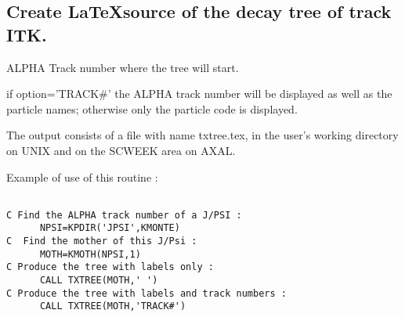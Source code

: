 \subsection{\label{sec-TXTR}Create \LaTeX   source of the decay tree of track ITK.}
\par
{}
\par
\begin{indentlist}{ 2.50cm}{ 2.75cm}
ALPHA Track number where the tree will start.

if option='TRACK\#'
 the ALPHA track number will be displayed as well as the particle names;
 otherwise only the particle code is displayed.


The output consists of a file with name txtree.tex, in the user's working
directory on UNIX and on the SCWEEK area on AXAL.

\end{indentlist}

Example of use of this routine :
\begin{verbatim}

C Find the ALPHA track number of a J/PSI :
      NPSI=KPDIR('JPSI',KMONTE) 
C  Find the mother of this J/Psi :
      MOTH=KMOTH(NPSI,1)
C Produce the tree with labels only :
      CALL TXTREE(MOTH,' ')
C Produce the tree with labels and track numbers :
      CALL TXTREE(MOTH,'TRACK#')
\end{verbatim}

